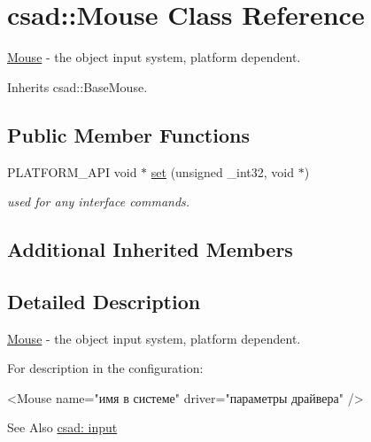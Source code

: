 \hypertarget{classcsad_1_1_mouse}{\section{csad\-:\-:Mouse Class Reference}
\label{classcsad_1_1_mouse}
}


\hyperlink{classcsad_1_1_mouse}{Mouse} -\/ the object input system, platform dependent.  




Inherits csad\-::\-Base\-Mouse.

\subsection*{Public Member Functions}
\begin{DoxyCompactItemize}
\item 
\hypertarget{classcsad_1_1_mouse_aff936deb785be6c3790e2fc187d88109}{P\-L\-A\-T\-F\-O\-R\-M\-\_\-\-A\-P\-I void $\ast$ \hyperlink{classcsad_1_1_mouse_aff936deb785be6c3790e2fc187d88109}{set} (unsigned \-\_\-int32, void $\ast$)}\label{classcsad_1_1_mouse_aff936deb785be6c3790e2fc187d88109}

\begin{DoxyCompactList}\small\item\em used for any interface commands. \end{DoxyCompactList}\end{DoxyCompactItemize}
\subsection*{Additional Inherited Members}


\subsection{Detailed Description}
\hyperlink{classcsad_1_1_mouse}{Mouse} -\/ the object input system, platform dependent. 

For description in the configuration\-: \begin{DoxyVerb}  <Mouse name="имя в системе" driver="параметры драйвера" />
\end{DoxyVerb}
 \begin{DoxySeeAlso}{See Also}
\hyperlink{group__input}{csad\-: input} 
\end{DoxySeeAlso}
